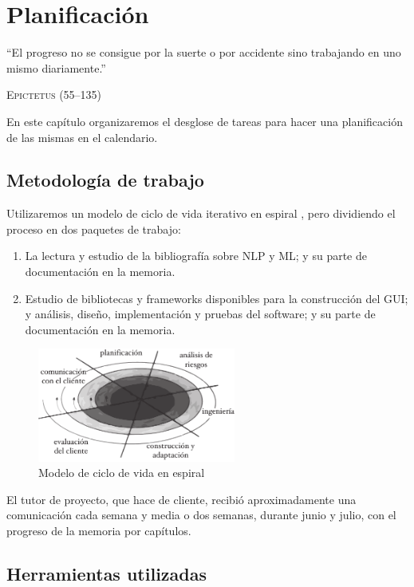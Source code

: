 
\chapter{Planificación}

\epigraph{``El progreso no se consigue por la suerte o por accidente sino trabajando en uno mismo diariamente.''}{\textsc{Epictetus} (55--135)}

En este capítulo organizaremos el desglose de tareas para hacer una planificación de las mismas en el calendario.

\section{Metodología de trabajo}

Utilizaremos un modelo de ciclo de vida iterativo en espiral \citep{Boehm1988}, pero dividiendo el proceso en dos paquetes de trabajo:
\begin{enumerate}[WP1]
\item La lectura y estudio de la bibliografía sobre NLP y ML; y su parte de documentación en la memoria.
\item Estudio de bibliotecas y frameworks disponibles para la construcción del GUI; y análisis, diseño, implementación y pruebas del software; y su parte de documentación en la memoria.
\end{enumerate}

\begin{figure}[htbp]
\centering
\includegraphics[width=0.58\textwidth]{espiral}
\caption[Modelo de ciclo de vida en espiral]{Modelo de ciclo de vida en espiral \citep{Boehm1988}}
\label{fig:espiral}
\end{figure}

El tutor de proyecto, que hace de cliente, recibió aproximadamente una comunicación cada semana y media o dos semanas, durante junio y julio, con el progreso de la memoria por capítulos.

\section{Herramientas utilizadas}

